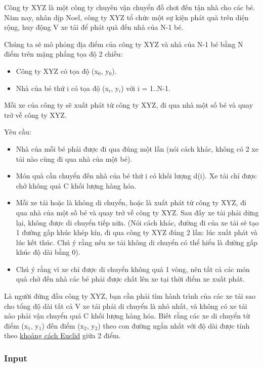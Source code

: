 

Công ty XYZ là một công ty chuyên vận chuyển đồ chơi đến tận nhà cho các bé. Năm nay, nhân dịp Noel, công ty XYZ tổ chức một sự kiện phát quà trên diện rộng, huy động V xe tải để phát quà đến nhà của N-1 bé.

Chúng ta sẽ mô phỏng địa điểm của công ty XYZ và nhà của N-1 bé bằng N điểm trên mặng phẳng tọa độ 2 chiều:
\begin{itemize}
	\item Công ty XYZ có tọa độ (x$_0$, y$_0$).
	\item Nhà của bé thứ i có tọa độ (x$_i$, y$_i$) với i = 1..N-1.
\end{itemize}

Mỗi xe của công ty sẽ xuất phát từ công ty XYZ, đi qua nhà một số bé và quay trở về công ty XYZ.

Yêu cầu:
\begin{itemize}
	\item Nhà của mỗi bé phải được đi qua đúng một lần (nói cách khác, không có 2 xe tải nào cùng đi qua nhà của một bé).
	\item Món quà cần chuyển đến nhà của bé thứ i có khối lượng d(i). Xe tải chỉ được chở không quá C khối lượng hàng hóa.
	\item Mỗi xe tải hoặc là không di chuyển, hoặc là xuất phát từ công ty XYZ, đi qua nhà của một số bé và quay trở về công ty XYZ. Sau đấy xe tải phải dừng lại, không được di chuyển tiếp nữa. (Nói cách khác, đường đi của xe tải sẽ tạo 1 đường gấp khúc khép kín, đi qua công ty XYZ đúng 2 lần: lúc xuất phát và lúc kết thúc. Chú ý rằng nếu xe tải không di chuyển có thể hiểu là đường gấp khúc độ dài bằng 0).
	\item Chú ý rằng vì xe chỉ được di chuyển không quá 1 vòng, nên tất cả các món quà chở đến nhà các bé phải được chất lên xe tại thời điểm xe xuất phát.
\end{itemize}

Là người đứng đầu công ty XYZ, bạn cần phải tìm hành trình của các xe tải sao cho tổng độ dài tất cả V xe tải phải di chuyển là nhỏ nhất, và không có xe tải nào phải vận chuyển quá C khối lượng hàng hóa. Biết rằng các xe di chuyển từ điểm (x$_1$, y$_1$) đến điểm (x$_2$, y$_2$) theo con đường ngắn nhất với độ dài được tính theo \href{http://vi.wikipedia.org/wiki/Kho%E1%BA%A3ng_c%C3%A1ch_Euclid}{khoảng cách Euclid} giữa 2 điểm.

\subsubsection{Input}

